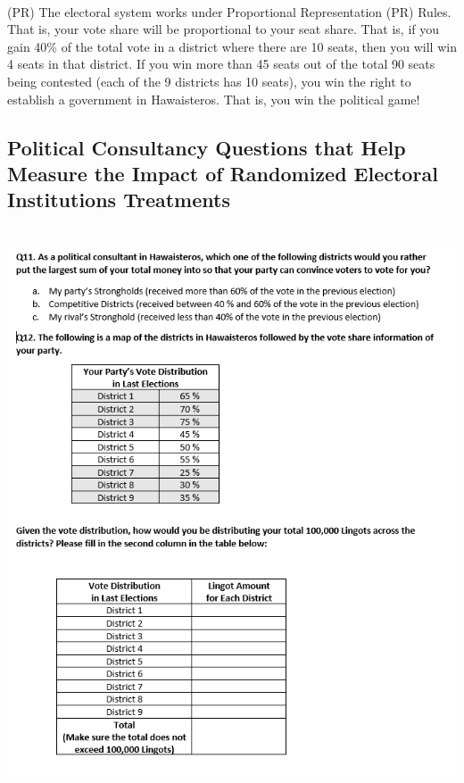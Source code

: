 \documentclass{article}
\begin{document}
\\
(PR) The electoral system works under Proportional Representation (PR) Rules. That is, your vote share will be proportional to your seat share. That is, if you gain 40\% of the total vote in a district where there are 10 seats, then you will win 4 seats in that district. If you win more than 45 seats out of the total 90 seats being contested (each of the 9 districts has 10 seats), you win the right to establish a government in Hawaisteros. That is, you win the political game!
\subsection{Political Consultancy Questions that Help Measure the Impact of Randomized Electoral Institutions Treatments}
\\
\includegraphics[width=140mm]{Survey_Question}
\\
\\
\\\\
\\
\\
\\
\end{document}
